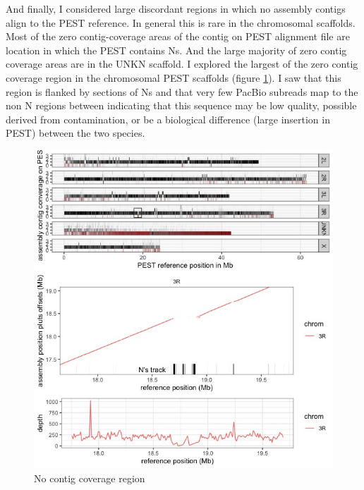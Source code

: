 \par{
And finally, I considered large discordant regions in which no assembly contigs align to the PEST reference. In general this is rare in the chromosomal scaffolds. Most of the zero contig-coverage areas of the contig on PEST alignment file are location in which the PEST contains Ns. And the large majority of zero contig coverage areas are in the UNKN scaffold. I explored the largest of the zero contig coverage region in the chromosomal PEST scaffolds (figure \ref{figure:nocovplot}). I saw that this region is flanked by sections of Ns and that very few PacBio subreads map to the non N regions between indicating that this sequence may be low quality, possible derived from contamination, or be a biological difference (large insertion in PEST) between the two species.
}

\begin{figure}[htbp!]

\caption{No contig coverage region}
\label{figure:nocovplot}
\begin{centering}
\includegraphics[width=1.0\textwidth]{Nocovplot.jpeg}
\end{centering}

\end{figure}



